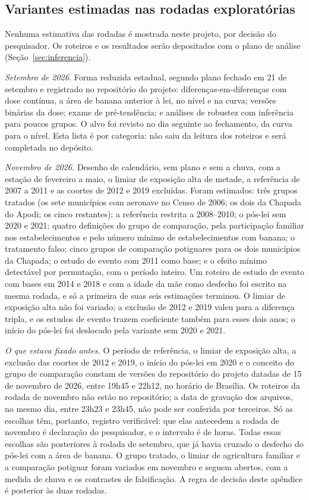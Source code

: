 \begin{apendicesenv}
\section{Variantes estimadas nas rodadas exploratórias}

Nenhuma estimativa das rodadas é mostrada neste projeto, por decisão do
pesquisador. Os roteiros e os resultados serão depositados com o plano de
análise (Seção~\ref{sec:inferencia}).

\emph{Setembro de 2026.} Forma reduzida estadual, segundo plano fechado em 21
de setembro e registrado no repositório do projeto:
diferenças-em-diferenças com dose contínua, a área de banana anterior à lei,
no nível e na curva; versões binárias da dose; exame de pré-tendência; e
análises de robustez com inferência para poucos grupos. O alvo foi revisto no
dia seguinte ao fechamento, da curva para o nível. Esta lista é por
categoria: não saiu da leitura dos roteiros e será completada no depósito.

\emph{Novembro de 2026.} Desenho de calendário, sem plano e sem a chuva, com
a estação de fevereiro a maio, o limiar de exposição alta de metade, a
referência de 2007 a 2011 e as coortes de 2012 e 2019 excluídas. Foram
estimados: três grupos tratados (os sete municípios com aeronave no Censo de
2006; os dois da Chapada do Apodi; os cinco restantes); a referência restrita
a 2008--2010; o pós-lei sem 2020 e 2021; quatro definições do grupo de
comparação, pela participação familiar nos estabelecimentos e pelo número
mínimo de estabelecimentos com banana; o tratamento falso; cinco grupos de
comparação potiguares para os dois municípios da Chapada; o estudo de evento
com 2011 como base; e o efeito mínimo detectável por permutação, com o
período inteiro. Um roteiro de estudo de evento com bases em 2014 e 2018 e
com a idade da mãe como desfecho foi escrito na mesma rodada, e só a
primeira de suas seis estimações terminou. O limiar de
exposição alta não foi variado; a exclusão de 2012 e 2019 valeu para a
diferença tripla, e os estudos de evento trazem coeficiente também para esses
dois anos; o início do pós-lei foi deslocado pela variante sem 2020 e 2021.

\emph{O que estava fixado antes.} O período de referência, o limiar de
exposição alta, a exclusão das coortes de 2012 e 2019, o início do pós-lei em
2020 e o conceito do grupo de comparação constam de versões do repositório
do projeto datadas de 15 de novembro de 2026, entre 19h45 e 22h12, no horário
de Brasília. Os roteiros da rodada de novembro não estão no repositório; a
data de gravação dos arquivos, no mesmo dia, entre 23h23 e 23h45, não pode
ser conferida por terceiros. Só as escolhas têm, portanto, registro
verificável: que elas antecedem a rodada de novembro é declaração do
pesquisador, e o intervalo é de horas. Todas essas escolhas
são posteriores à rodada de setembro, que já havia cruzado o desfecho do
pós-lei com a área de banana. O grupo tratado, o limiar de agricultura
familiar e a comparação potiguar foram variados em novembro e seguem abertos,
com a medida de chuva e os contrastes de falsificação. A regra de decisão
deste apêndice é posterior às duas rodadas.
\end{apendicesenv}

